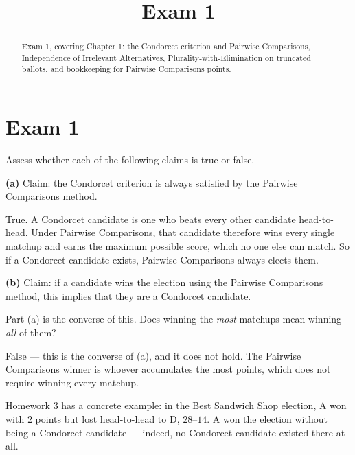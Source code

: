 \documentclass[12pt]{ximera}
\title{Exam 1}
\begin{document}
\begin{abstract}
Exam 1, covering Chapter 1: the Condorcet criterion and Pairwise Comparisons,
Independence of Irrelevant Alternatives, Plurality-with-Elimination on truncated
ballots, and bookkeeping for Pairwise Comparisons points.
\end{abstract}
\maketitle

\section*{Exam 1}

\begin{problem}
Assess whether each of the following claims is true or false.

\begin{prompt}
\textbf{(a)} Claim: the Condorcet criterion is always satisfied by the Pairwise
Comparisons method.

\begin{multipleChoice}
\end{multipleChoice}

\begin{feedback}
True. A Condorcet candidate is one who beats every other candidate head-to-head. Under
Pairwise Comparisons, that candidate therefore wins every single matchup and earns the
maximum possible score, which no one else can match. So if a Condorcet candidate
exists, Pairwise Comparisons always elects them.
\end{feedback}
\end{prompt}

\begin{prompt}
\textbf{(b)} Claim: if a candidate wins the election using the Pairwise Comparisons
method, this implies that they are a Condorcet candidate.

\begin{multipleChoice}
\end{multipleChoice}

\begin{hint}
Part (a) is the converse of this. Does winning the \emph{most} matchups mean winning
\emph{all} of them?
\end{hint}

\begin{feedback}
False --- this is the converse of (a), and it does not hold. The Pairwise Comparisons
winner is whoever accumulates the most points, which does not require winning every
matchup.

Homework 3 has a concrete example: in the Best Sandwich Shop election, A won with $2$
points but lost head-to-head to D, $28$--$14$. A won the election without being a
Condorcet candidate --- indeed, no Condorcet candidate existed there at all.
\end{feedback}
\end{prompt}
\end{problem}
\end{document}
